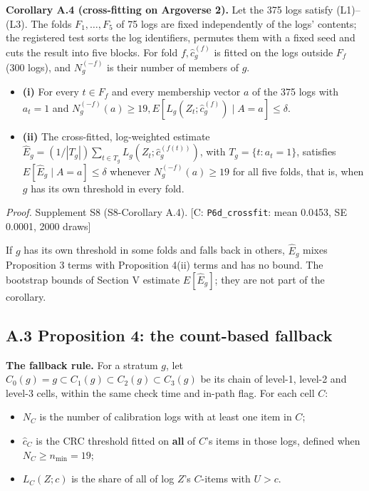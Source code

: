 \documentclass{ieeeaccess}
\begin{document}
\textbf{Corollary A.4 (cross-fitting on Argoverse 2).} Let the 375 logs satisfy (L1)--(L3). The folds $F_{1}, \dots, F_{5}$ of 75 logs are fixed independently of the logs' contents; the registered test sorts the log identifiers, permutes them with a fixed seed and cuts the result into five blocks. For fold $f, \hat{c}_{g}^{(f)}$ is fitted on the logs outside $F_{f}$ (300 logs), and $N_{g}^{(-f)}$ is their number of members of $g$.

\begin{itemize}
\item \textbf{(i)} For every $t \in F_{f}$ and every membership vector $a$ of the 375 logs with $a_{t} = 1$ and $N_{g}^{(-f)}(a) \geq 19, E[L_{g}(Z_{t}; \hat{c}_{g}^{(f)}) \mid A = a] \leq \delta$.
\item \textbf{(ii)} The cross-fitted, log-weighted estimate $\hat{E}_{g} = (1/|T_{g}|)\sum_{t\in T_{g}} L_{g}(Z_{t}; \hat{c}_{g}^{(f(t))})$, with $T_{g} = \{t : a_{t} = 1\}$, satisfies $E[\hat{E}_{g} \mid A = a] \leq \delta$ whenever $N_{g}^{(-f)}(a) \geq 19$ for all five folds, that is, when $g$ has its own threshold in every fold.
\end{itemize}

\emph{Proof.} Supplement S8 (S8-Corollary A.4). [C: \texttt{P6d\_crossfit}: mean 0.0453, SE 0.0001, 2000 draws]

If $g$ has its own threshold in some folds and falls back in others, $\hat{E}_{g}$ mixes Proposition 3 terms with Proposition 4(ii) terms and has no bound. The bootstrap bounds of Section V estimate $E[\hat{E}_{g}]$; they are not part of the corollary.

\subsection*{A.3 Proposition 4: the count-based fallback}
\textbf{The fallback rule.} For a stratum $g$, let $C_{0}(g) = g \subset C_{1}(g) \subset C_{2}(g) \subset C_{3}(g)$ be its chain of level-1, level-2 and level-3 cells, within the same check time and in-path flag. For each cell $C$:

\begin{itemize}
\item $N_{C}$ is the number of calibration logs with at least one item in $C$;
\item $\hat{c}_{C}$ is the CRC threshold fitted on \textbf{all} of $C$'s items in those logs, defined when $N_{C} \geq n_{\min} = 19$;
\item $L_{C}(Z; c)$ is the share of all of log $Z$'s $C$-items with $U > c$.
\end{itemize}
\end{document}
